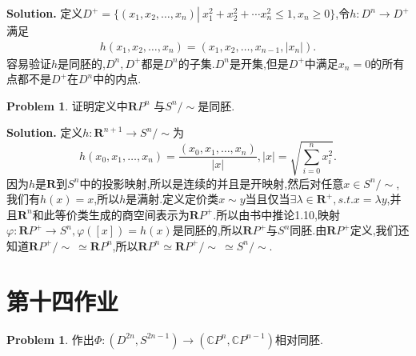 \documentclass[a4paper]{book}
\newenvironment{solution}%
{\noindent\textbf{Solution.}}%
{\qedhere}
\numberwithin{equation}{chapter}
\theoremstyle{definition}
\newtheorem{pro}[exm]{Problem}
\begin{document}
\begin{solution}
  定义$D^+ = \{(x_1,x_2,\ldots,x_n)\left.\right| \ x_1^2+ x_2^2 + \cdots x_n^2 \leq 1,x_n \geq 0\}$,令$h\colon D^n \rightarrow D^+$满足
  \begin{align*}
    h(x_1,x_2,\ldots,x_n) = (x_1,x_2,\ldots,x_{n-1},\left| x_n \right|).
  \end{align*}
  容易验证$h$是同胚的,$D^n,D^+$都是$D^n$的子集.$D^n$是开集,但是$D^+$中满足$x_n = 0$的所有点都不是$D^+$在$D^n$中的内点.
\end{solution}

\begin{pro}
  证明定义中$\mathbf{R}P^n$ 与$S^n / \sim$是同胚.
\end{pro}

\begin{solution}
  定义$h: \mathbf{R}^{n+1} \rightarrow S^n/\sim$为
  \[h(x_0,x_1,\ldots,x_{n}) =
    \frac{(x_0,x_1,\ldots,x_n)}{\left| x \right|},  \left| x \right| = \sqrt{\sum_{i=0}^n x_i^2}.\]
  因为$h$是$\mathbf{R}$到$S^{n}$中的投影映射,所以是连续的并且是开映射,然后对任意$x \in S^n/\sim$,我们有$h(x) = x$,所以$h$是满射.定义定价类$x \sim y $当且仅当$\exists \lambda \in \mathbf{R}^+,s.t. x = \lambda y$,并且$\mathbf{R}^n$和此等价类生成的商空间表示为$\mathbf{R}P^+$.所以由书中推论1.10,映射$\varphi \colon \mathbf{R}P^+  \rightarrow S^n, \varphi([x]) = h(x)$是同胚的,所以$\mathbf{R}P^+$与$S^n$同胚.由$\mathbf{R}P^+$定义,我们还知道$\mathbf{R}P^+/ \sim\  \simeq \mathbf{R}P^n$,所以$\mathbf{R}P^n \simeq \mathbf{R}P^+/ \sim\ \simeq S^n/ \sim$.
\end{solution}

\section{第十四作业}

\begin{pro}
  作出$\Phi \colon (D^{2n}, S^{2n-1}) \rightarrow (\mathbb{C}P^n, \mathbb{C}P^{n-1})$相对同胚.
\end{pro}
\end{document}
